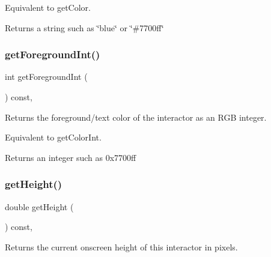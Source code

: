 Equivalent to get\+Color. \begin{DoxyReturn}{Returns}
a string such as \char`\"{}blue\char`\"{} or \char`\"{}\#7700ff\char`\"{} 
\end{DoxyReturn}
\mbox{\label{classsgl_1_1GInteractor_ac3b12ab385a6ef9ae90fc879860ba726}} 
\subsubsection{\texorpdfstring{get\+Foreground\+Int()}{getForegroundInt()}}
{\footnotesize\ttfamily int get\+Foreground\+Int (\begin{DoxyParamCaption}{ }\end{DoxyParamCaption}) const\hspace{0.3cm}{\ttfamily [virtual]}, {\ttfamily [inherited]}}



Returns the foreground/text color of the interactor as an R\+GB integer. 

Equivalent to get\+Color\+Int. \begin{DoxyReturn}{Returns}
an integer such as 0x7700ff 
\end{DoxyReturn}
\mbox{\label{classsgl_1_1GInteractor_a1e7e353362434072875264cf95629f99}} 
\subsubsection{\texorpdfstring{get\+Height()}{getHeight()}}
{\footnotesize\ttfamily double get\+Height (\begin{DoxyParamCaption}{ }\end{DoxyParamCaption}) const\hspace{0.3cm}{\ttfamily [virtual]}, {\ttfamily [inherited]}}



Returns the current onscreen height of this interactor in pixels. 

\mbox{\label{classsgl_1_1GTextArea_a58d3b7767e049484e3d7507379e6ecc7}} 
